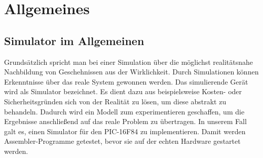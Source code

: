 \documentclass[
10pt, %
a4paper, %
oneside, %
headinclude,footinclude, %
BCOR5mm, %
]{scrartcl}
\title{\normalfont\spacedallcaps{Pic-Simulator Dokumentation}} %
\author{\spacedlowsmallcaps{David Schmidt \& Moritz Knapp}} %
\date{} %
\begin{document}

\renewcommand{\sectionmark}[1]{\markright{\spacedlowsmallcaps{#1}}} %
\lehead{\mbox{\llap{\small\thepage\kern1em\color{halfgray} \vline}\color{halfgray}\hspace{0.5em}\rightmark\hfil}} %

\pagestyle{scrheadings} %


\maketitle %

\setcounter{tocdepth}{2} %

\tableofcontents %

\listoffigures %

\newpage %


\section{Allgemeines}

\subsection{Simulator im Allgemeinen}
	Grundsätzlich spricht man bei einer Simulation über die möglichst realitätsnahe Nachbildung von Geschehnissen aus der Wirklichkeit. Durch Simulationen können Erkenntnisse über das reale System gewonnen werden. Das simulierende Gerät wird als Simulator bezeichnet. Es dient dazu aus beispielsweise Kosten- oder Sicherheitsgründen sich von der Realität zu lösen, um diese abstrakt zu behandeln. Dadurch wird ein Modell zum experimentieren geschaffen, um die Ergebnisse anschließend auf das reale Problem zu übertragen. In unserem Fall galt es, einen Simulator für den PIC-16F84 zu implementieren. Damit werden Assembler-Programme getestet, bevor sie auf der echten Hardware gestartet werden.
	
\end{document}

